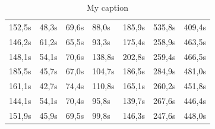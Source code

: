 \documentclass{scrartcl}
\begin{document}
\begin{table}[h]
\begin{tabular}{@{}lllllll@{}}
152,5s    & 48,3s      & 69,6s      & 88,0s       & 185,9s      & 535,8s      & 409,4s       \\
146,2s    & 61,2s      & 65,5s      & 93,3s       & 175,4s      & 258,9s      & 463,5s       \\
148,1s    & 54,1s      & 70,6s      & 138,8s      & 202,8s      & 259,4s      & 466,5s       \\
185,5s    & 45,7s      & 67,0s      & 104,7s      & 186,5s      & 284,9s      & 481,0s       \\
161,1s    & 42,7s      & 74,4s      & 110,8s      & 165,1s      & 260,2s      & 451,8s       \\
144,1s    & 54,1s      & 70,4s      & 95,8s       & 139,7s      & 267,6s      & 446,4s       \\
151,9s    & 45,9s      & 69,5s      & 99,8s       & 146,3s      & 247,6s      & 448,0s       \\ \bottomrule
\end{tabular}
\caption{My caption}
\label{my-label}
\end{table}

\clearpage
\end{document}
